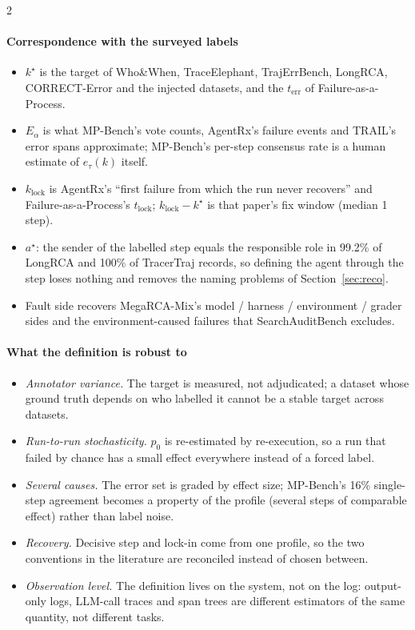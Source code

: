 \begin{multicols}{2}
\paragraph{Correspondence with the surveyed labels}
\begin{itemize}[leftmargin=1.1em]
\item $k^\star$ is the target of Who\&When, TraceElephant, TrajErrBench, LongRCA, CORRECT-Error and the injected datasets, and the $t_{\mathrm{err}}$ of Failure-as-a-Process.
\item $E_\alpha$ is what MP-Bench's vote counts, AgentRx's failure events and TRAIL's error spans approximate; MP-Bench's per-step consensus rate is a human estimate of $e_\tau(k)$ itself.
\item $k_{\mathrm{lock}}$ is AgentRx's ``first failure from which the run never recovers'' and Failure-as-a-Process's $t_{\mathrm{lock}}$; $k_{\mathrm{lock}}-k^\star$ is that paper's fix window (median 1 step).
\item $a^\star$: the sender of the labelled step equals the responsible role in 99.2\% of LongRCA and 100\% of TracerTraj records, so defining the agent through the step loses nothing and removes the naming problems of Section~\ref{sec:reco}.
\item Fault side recovers MegaRCA-Mix's model / harness / environment / grader sides and the environment-caused failures that SearchAuditBench excludes.
\end{itemize}

\paragraph{What the definition is robust to}
\begin{itemize}[leftmargin=1.1em]
\item \emph{Annotator variance.} The target is measured, not adjudicated; a dataset whose ground truth depends on who labelled it cannot be a stable target across datasets.
\item \emph{Run-to-run stochasticity.} $p_0$ is re-estimated by re-execution, so a run that failed by chance has a small effect everywhere instead of a forced label.
\item \emph{Several causes.} The error set is graded by effect size; MP-Bench's 16\% single-step agreement becomes a property of the profile (several steps of comparable effect) rather than label noise.
\item \emph{Recovery.} Decisive step and lock-in come from one profile, so the two conventions in the literature are reconciled instead of chosen between.
\item \emph{Observation level.} The definition lives on the system, not on the log: output-only logs, LLM-call traces and span trees are different estimators of the same quantity, not different tasks.
\end{itemize}


\end{multicols}
